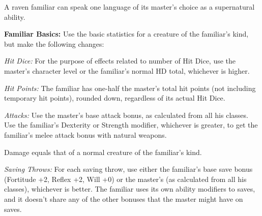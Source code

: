 
A raven familiar can speak one language of its master's choice as a supernatural ability.

\textbf{Familiar Basics:} Use the basic statistics for a creature of the familiar's kind, but make the following changes:

\textit{Hit Dice:} For the purpose of effects related to number of Hit Dice, use the master's character level or the familiar's normal HD total, whichever is higher.

\textit{Hit Points:} The familiar has one-half the master's total hit points (not including temporary hit points), rounded down, regardless of its actual Hit Dice.

\textit{Attacks:} Use the master's base attack bonus, as calculated from all his classes. Use the familiar's Dexterity or Strength modifier, whichever is greater, to get the familiar's melee attack bonus with natural weapons.

Damage equals that of a normal creature of the familiar's kind.

\textit{Saving Throws:} For each saving throw, use either the familiar's base save bonus (Fortitude +2, Reflex +2, Will +0) or the master's (as calculated from all his classes), whichever is better. The familiar uses its own ability modifiers to saves, and it doesn't share any of the other bonuses that the master might have on saves.

